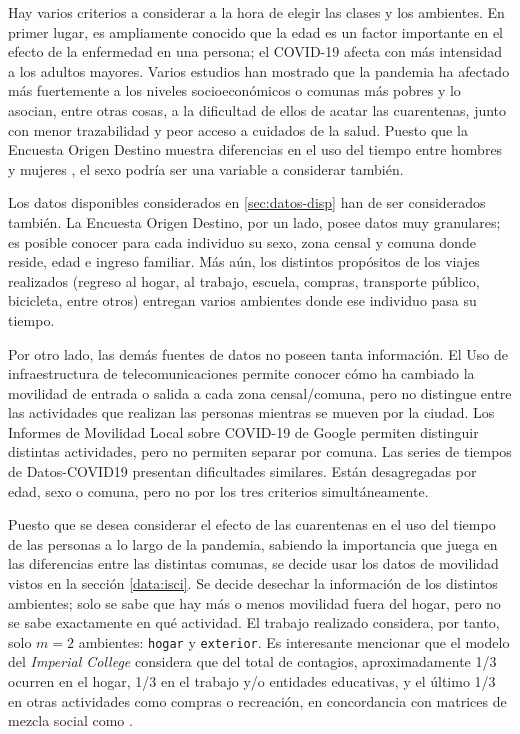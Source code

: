 Hay varios criterios a considerar a la hora de elegir las clases y los ambientes. En primer lugar, es ampliamente conocido \cite{Davies2020}\cite{Verity2020} que la edad es un factor importante en el efecto de la enfermedad en una persona; el COVID-19 afecta con más intensidad a los adultos mayores. Varios estudios \cite{Wang2020}\cite{Ahmed2020}\cite{Chang2021}\cite{Mena2021}\cite{Bennett2021} han mostrado que la pandemia ha afectado más fuertemente a los niveles socioeconómicos o comunas más pobres y lo asocian, entre otras cosas, a la dificultad de ellos de acatar las cuarentenas, junto con menor trazabilidad y peor acceso a cuidados de la salud. Puesto que la Encuesta Origen Destino muestra diferencias en el uso del tiempo entre hombres y mujeres \cite{Jara-Diaz2013}, el sexo podría ser una variable a considerar también.

Los datos disponibles considerados en \ref{sec:datos-disp} han de ser considerados también. La Encuesta Origen Destino, por un lado, posee datos muy granulares; es posible conocer para cada individuo su sexo, zona censal y comuna donde reside, edad e ingreso familiar. Más aún, los distintos propósitos de los viajes realizados (regreso al hogar, al trabajo, escuela, compras, transporte público, bicicleta, entre otros) entregan varios ambientes donde ese individuo pasa su tiempo. 

Por otro lado, las demás fuentes de datos no poseen tanta información. El Uso de infraestructura de telecomunicaciones permite conocer cómo ha cambiado la movilidad de entrada o salida a cada zona censal/comuna, pero no distingue entre las actividades que realizan las personas mientras se mueven por la ciudad. Los Informes de Movilidad Local sobre COVID-19 de Google permiten distinguir distintas actividades, pero no permiten separar por comuna. Las series de tiempos de Datos-COVID19 presentan dificultades similares. Están desagregadas por edad, sexo o comuna, pero no por los tres criterios simultáneamente. 

Puesto que se desea considerar el efecto de las cuarentenas en el uso del tiempo de las personas a lo largo de la pandemia, sabiendo la importancia que juega en las diferencias entre las distintas comunas, se decide usar los datos de movilidad vistos en la sección \ref{data:isci}. Se decide desechar la información de los distintos ambientes; solo se sabe que hay más o menos movilidad fuera del hogar, pero no se sabe exactamente en qué actividad. El trabajo realizado considera, por tanto, solo \(m = 2\) ambientes: \texttt{hogar} y \texttt{exterior}. Es interesante mencionar que el modelo del \textit{Imperial College} \cite{Ferguson2020} considera que del total de contagios, aproximadamente 1/3 ocurren en el hogar, 1/3 en el trabajo y/o entidades educativas, y el último 1/3 en otras actividades como compras o recreación, en concordancia con matrices de mezcla social como \cite{Mossong2008}.

